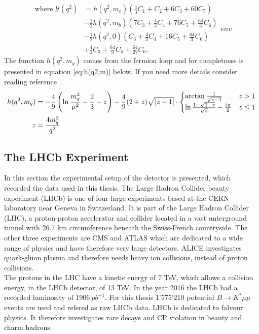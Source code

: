\documentclass[english]{uzhpub}
\begin{document}
\begin{equation}
 \begin{split}
  \text{where   } \mathcal{Y} (q^2) &= h(q^2,m_c) \left( \frac{4}{3}C_1 + C_2 + 6C_3 + 60C_5 \right) \\
  &- \frac{1}{2} h(q^2,m_b) \left(7C_3 + \frac{4}{3}C_4 + 76C_5 + \frac{64}{3} C_6  \right) \\
  &- \frac{1}{2} h(q^2,0) \left( C_3 + \frac{4}{3}C_4 + 16C_5 + \frac{64}{3} C_6 \right) \\
  &+ \frac{4}{3} C_3 + \frac{64}{9} C_5 + \frac{64}{27} C_6 .
 \end{split}env
\end{equation}
The function $h(q^2,m_q)$ comes from the fermion loop and for completness is presented in equation \ref{eq:h(q2,m)} below. If you need more details consider reading reference \cite{bib:Wilson}.
\begin{align}
 h(q^2,m_q)                                            & = - \frac{4}{9} \left(\ln{\frac{m_q^2}{\mu^2}} - \frac{2}{3} - z \right) - \frac{4}{9}(2+z) \sqrt{|z-1|}  \cdot  \begin{cases}
 \arctan{\frac{1}{\sqrt{z-1}}}                         & z > 1                                                                                                                          \\
 \ln{\frac{1+ \sqrt{1-z}}{\sqrt{z}}} - \frac{i \pi}{2} & z \leq 1
 \end{cases}
 \label{eq:h(q2,m)} \\
 \notag z                                              & = \frac{4m_q^2}{q^2}
\end{align}


\subsection{The LHCb Experiment} \label{sec:LHCb}
In this section the experimental setup of the detector is presented, which recorded the data used in this thesis.
The Large Hadron Collider beauty experiment (LHCb) is one of four large experiments based at the CERN laboratory near Geneva in Switzerland. It is part of the Large Hadron Collider (LHC), a proton-proton accelerator and collider located in a vast unterground tunnel with 26.7 km circumference beneath the Swiss-French countryside.
The other three experiments are CMS and ATLAS which are dedicated to a wide range of physics and have therefore very large detectors. ALICE investigates quark-gluon plasma and therefore needs heavy ion collisions, instead of proton collisions. \\
The protons in the LHC have a kinetic energy of 7 TeV, which allows a collision energy, in the LHCb detector, of 13 TeV. In the year 2016 the LHCb had a recorded luminosity of $\SI{1906}{pb^{-1}}$. For this thesis 1'575'210 potential $B \rightarrow K^* \mu \mu$ events are used and refered as raw LHCb data.
LHCb is dedicated to falvour physics. It therefore investigates rare decays and CP violation in beauty and charm hadrons.
\end{document}
